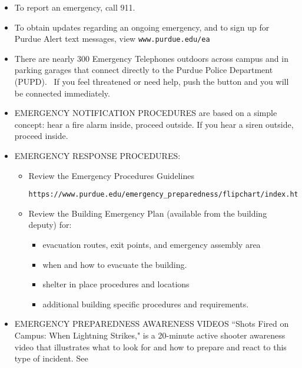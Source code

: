 \documentclass[10pt]{article}
\begin{document}
\begin{itemize}
\item  To report an emergency, call 911.

\item  To obtain updates regarding an ongoing emergency, and to sign up for
    Purdue Alert text messages, view {\tt www.purdue.edu/ea}

\item There are nearly 300 Emergency Telephones outdoors across campus
and in parking garages that connect directly to the Purdue Police Department
(PUPD).  If you feel threatened or need help, push the button and you will
be connected immediately.

\item EMERGENCY NOTIFICATION PROCEDURES are based on a simple concept:
  hear a fire alarm inside, proceed outside. If you hear a siren outside,
proceed inside.

\item EMERGENCY RESPONSE PROCEDURES:

\begin{itemize}
\item Review the Emergency Procedures Guidelines
\begin{verbatim}
https://www.purdue.edu/emergency_preparedness/flipchart/index.html
\end{verbatim}

\item Review the Building Emergency Plan (available from the building deputy)
for:
\begin{itemize}  
\item evacuation routes, exit points, and emergency assembly area

\item when and how to evacuate the building.

\item  shelter in place procedures and locations

\item additional building specific procedures and requirements.
\end{itemize}
\end{itemize}

\item EMERGENCY PREPAREDNESS AWARENESS VIDEOS
``Shots Fired on Campus: When Lightning Strikes," is a 20-minute active
shooter awareness video that illustrates what to look for and how to prepare
and react to this type of incident. See 


\end{itemize}
\end{document}
